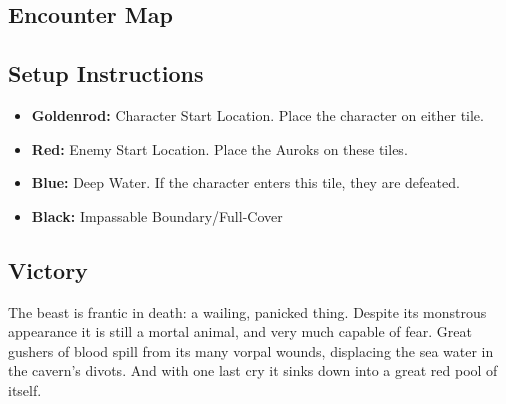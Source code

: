 \subsection*{Encounter Map}
\begin{center}
\end{center}

\subsection*{Setup Instructions}
\begin{itemize}
\item \textbf{Goldenrod:} Character Start Location. Place the character on either tile.
\item \textbf{Red:} Enemy Start Location. Place the Auroks on these tiles.
\item \textbf{Blue:} Deep Water. If the character enters this tile, they are defeated.
\item \textbf{Black:} Impassable Boundary/Full-Cover
\end{itemize}

\pagebreak

\subsection*{Victory}
The beast is frantic in death: a wailing, panicked thing. Despite its monstrous appearance it is still a mortal animal, and very much capable of fear. Great gushers of blood spill from its many vorpal wounds, displacing the sea water in the cavern's divots. And with one last cry it sinks down into a great red pool of itself.\\


